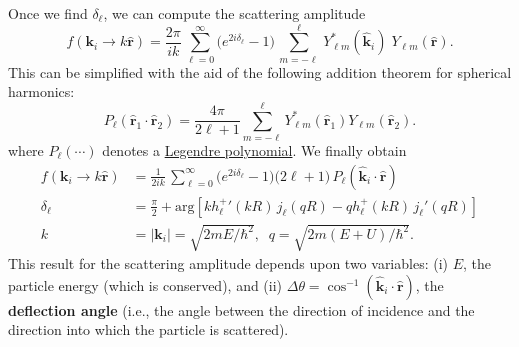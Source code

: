 \documentclass[pra,12pt]{revtex4}
\begin{document}
Once we find $\delta_\ell$, we can compute the scattering amplitude
$$f(\mathbf{k}_i\rightarrow k\hat{\mathbf{r}}) = \frac{2 \pi}{ik}\, \sum_{\ell =0}^\infty \big(e^{2i\delta_\ell} - 1\big) \, \sum_{m=-\ell}^\ell \,Y_{\ell m}^*(\hat{\mathbf{k}}_i)\; Y_{\ell m}(\hat{\mathbf{r}}).$$
This can be simplified with the aid of the following addition theorem
for spherical harmonics:
$$P_\ell(\hat{\mathbf{r}}_1\cdot\hat{\mathbf{r}}_2) = \frac{4\pi}{2\ell+1} \sum_{m=-\ell}^{\ell} Y_{\ell m}^*(\hat{\mathbf{r}}_1) Y_{\ell m}(\hat{\mathbf{r}}_2).$$
where $P_\ell(\cdots)$ denotes a
\href{https://en.wikipedia.org/wiki/Legendre_polynomials}{Legendre
  polynomial}.  We finally obtain
$$\boxed{\quad\begin{aligned}f(\mathbf{k}_i \rightarrow k\hat{\mathbf{r}}) &= \frac{1}{2ik}\, \sum_{\ell =0}^\infty \big(e^{2i\delta_\ell} - 1\big) \big(2\ell+1\big)\, P_{\ell}(\hat{\mathbf{k}}_i\cdot \hat{\mathbf{r}}) \\ \delta_\ell &= \frac{\pi}{2} + \mathrm{arg}\!\left[k{h_\ell^+}'(kR) \, j_\ell(qR) - qh_\ell^+(kR)\, j_\ell'(qR)\right] \\ k &= |\mathbf{k}_i| = \sqrt{2mE/\hbar^2}, \;\; q = \sqrt{2m(E+U)/\hbar^2}.\end{aligned}\quad}$$
This result for the scattering amplitude depends upon two variables:
(i) $E$, the particle energy (which is conserved), and (ii) $\Delta
\theta = \cos^{-1}(\hat{\mathbf{k}}_i\cdot \hat{\mathbf{r}})$, the
\textbf{deflection angle} (i.e., the angle between the direction of
incidence and the direction into which the particle is scattered).
\end{document}
